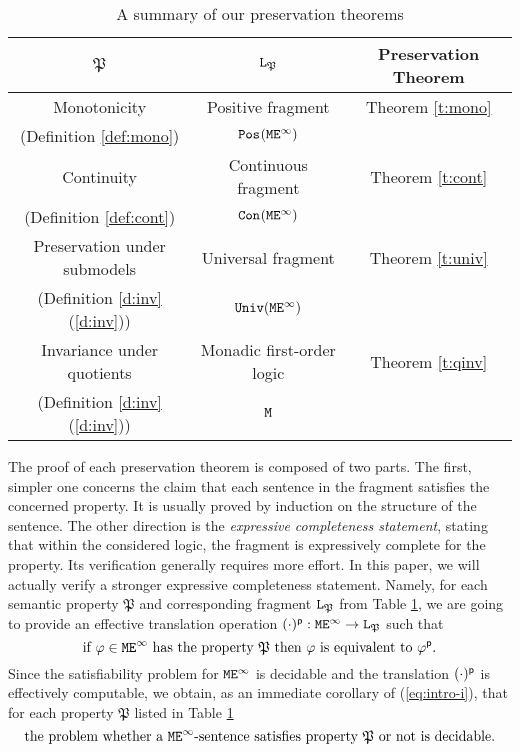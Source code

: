 \begin{table}[h!]
\begin{center}
\begin{tabular}{|c|c|c|}
\hline
$\mathfrak{P}$				
   & $\mathtt{L}_{\mathfrak{P}}$ 		
   & Preservation Theorem 
\\ \hline \hline
     Monotonicity     
   & Positive fragment         
   & Theorem \ref{t:mono}                        
\\ (Definition \ref{def:mono})		
   & $\mathtt{Pos}_{}(\mathtt{M}\mathtt{E}^{\infty})$
   &
\\ \hline	
     Continuity     
   & Continuous fragment  
   & Theorem \ref{t:cont}            
\\ (Definition \ref{def:cont})       	
   & $\mathtt{Con}_{}(\mathtt{M}\mathtt{E}^{\infty})$        
   &                              
\\\hline
     Preservation under submodels
   & Universal fragment    	 
   &          Theorem \ref{t:univ}                    
\\ (Definition \ref{d:inv}(\ref{d:inv}))    
   &          $\mathtt{Univ}(\mathtt{M}\mathtt{E}^{\infty}){}$          
   &                              
\\ \hline
     Invariance under quotients& Monadic first-order logic
   & Theorem \ref{t:qinv}                 
\\ (Definition \ref{d:inv}(\ref{d:inv}))   	
   & $\mathtt{M}$             	
   &                              
\\\hline
\end{tabular}
\caption{A summary of our preservation theorems}
\label{tab:0}
\end{center}
\end{table}

The proof of each  preservation theorem is composed of two parts. 
The first, simpler one concerns 
the claim that each sentence in the fragment satisfies the concerned property. 
It is usually proved  by induction on the structure of the sentence.  
The other direction is the  \emph{expressive completeness statement}, stating 
that within the considered logic, the fragment is expressively complete for the 
property. 
Its verification generally requires more effort. 
In this paper, we will actually verify a stronger expressive completeness 
statement. 
Namely, for each semantic property $\mathfrak{P}$ and corresponding fragment
$\mathtt{L}_{\mathfrak{P}}$ from Table \ref{tab:0}, we are going to provide an 
effective translation operation $(\cdot)^{\sf p}: \mathtt{M}\mathtt{E}^{\infty} \to 
\mathtt{L}_{\mathfrak{P}}$ such that \begin{equation}\label{eq:intro-i}
\text{if }\varphi \in \mathtt{M}\mathtt{E}^{\infty}\text{ has the property } \mathfrak{P} \text{ then }
\varphi \text{ is equivalent to } \varphi^{\sf p}.
\end{equation}
Since the satisfiability problem for $\mathtt{M}\mathtt{E}^{\infty}$ is decidable and the translation
$(\cdot)^{\sf p}$ is effectively computable, we obtain, as an immediate 
corollary of (\ref{eq:intro-i}), that for each property $\mathfrak{P}$ listed
in Table \ref{tab:0}
\begin{equation}\label{eq:intro-ii}
\text{the problem whether a $\mathtt{M}\mathtt{E}^{\infty}$-sentence satisfies property $\mathfrak{P}$
or not is decidable.}
\end{equation}


